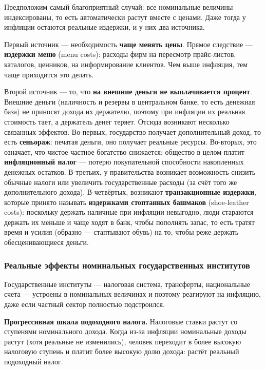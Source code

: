 \documentclass[11pt,a4paper]{article}
\begin{document}
Предположим самый благоприятный случай: все номинальные величины индексированы, то есть автоматически растут вместе с ценами. Даже тогда у инфляции остаются реальные издержки, и у них два источника.

Первый источник --- необходимость \textbf{чаще менять цены}. Прямое следствие --- \textbf{издержки меню} (menu costs): расходы фирм на пересмотр прайс-листов, каталогов, ценников, на информирование клиентов. Чем выше инфляция, тем чаще приходится это делать.

Второй источник --- то, что \textbf{на внешние деньги не выплачивается процент}. Внешние деньги (наличность и резервы в центральном банке, то есть денежная база) не приносят дохода их держателю, поэтому при инфляции их реальная стоимость тает, а держатель денег теряет. Отсюда возникают несколько связанных эффектов. Во-первых, государство получает дополнительный доход, то есть \textbf{сеньораж}: печатая деньги, оно получает реальные ресурсы. Во-вторых, это означает, что чистое частное богатство снижается: общество в целом платит \textbf{инфляционный налог} --- потерю покупательной способности накопленных денежных остатков. В-третьих, у правительства возникает возможность снизить обычные налоги или увеличить государственные расходы (за счёт того же дополнительного дохода). В-четвёртых, возникают \textbf{транзакционные издержки}, которые принято называть \textbf{издержками стоптанных башмаков} (shoe-leather costs): поскольку держать наличные при инфляции невыгодно, люди стараются держать их меньше и чаще ходят в банк, чтобы пополнять запас, то есть тратят время и усилия (образно --- стаптывают обувь) на то, чтобы реже держать обесценивающиеся деньги.

\subsubsection{Реальные эффекты номинальных государственных институтов}

Государственные институты --- налоговая система, трансферты, национальные счета --- устроены в номинальных величинах и поэтому реагируют на инфляцию, даже если частный сектор полностью подстроился.

\textbf{Прогрессивная шкала подоходного налога.} Налоговые ставки растут со ступенями номинального дохода. Когда из-за инфляции номинальные доходы растут (хотя реальные не изменились), человек переходит в более высокую налоговую ступень и платит более высокую долю дохода: растёт реальный подоходный налог.
\end{document}
